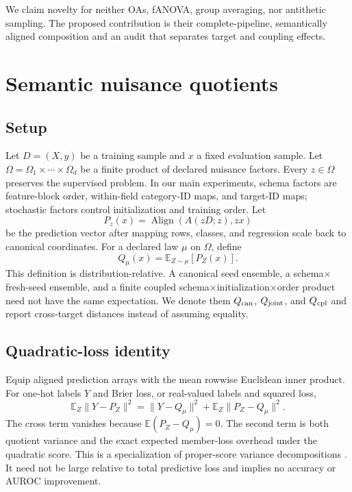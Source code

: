 \documentclass{article}
\newcommand{\E}{\mathbb{E}}
\begin{document}
We claim novelty for neither OAs, fANOVA, group averaging, nor antithetic
sampling. The proposed contribution is their complete-pipeline, semantically
aligned composition and an audit that separates target and coupling effects.

\section{Semantic nuisance quotients}
\label{sec:quotient}

\subsection{Setup}

Let $D=(X,y)$ be a training sample and $x$ a fixed evaluation sample. Let
$\Omega=\Omega_1\times\cdots\times\Omega_d$ be a finite product of declared
nuisance factors. Every $z\in\Omega$ preserves the supervised problem. In our
main experiments, schema factors are feature-block order, within-field
category-ID maps, and target-ID maps; stochastic factors control initialization
and training order. Let
\[
 P_z(x)=\operatorname{Align}\!\left(A(zD;z),zx\right)
\]
be the prediction vector after mapping rows, classes, and regression scale
back to canonical coordinates. For a declared law $\mu$ on $\Omega$, define
\[
 Q_\mu(x)=\E_{Z\sim\mu}[P_Z(x)]. \tag{1}
\]
This definition is distribution-relative. A canonical seed ensemble, a
schema$\times$fresh-seed ensemble, and a finite coupled
schema$\times$initialization$\times$order product need not have the same
expectation. We denote them $Q_{\rm can}$, $Q_{\rm joint}$, and $Q_{\rm cpl}$
and report cross-target distances instead of assuming equality.

\subsection{Quadratic-loss identity}

Equip aligned prediction arrays with the mean rowwise Euclidean inner product.
For one-hot labels $Y$ and Brier loss, or real-valued labels and squared loss,
\[
 \E_Z\lVert Y-P_Z\rVert^2
 =\lVert Y-Q_\mu\rVert^2+
   \E_Z\lVert P_Z-Q_\mu\rVert^2. \tag{2}
\]
The cross term vanishes because $\E(P_Z-Q_\mu)=0$. The second term is both
quotient variance and the exact expected member-loss overhead under the
quadratic score. This is a specialization of proper-score variance
decompositions \citep{gruber2023proper}. It need not be large relative to
total predictive loss and implies no accuracy or AUROC improvement.
\end{document}
